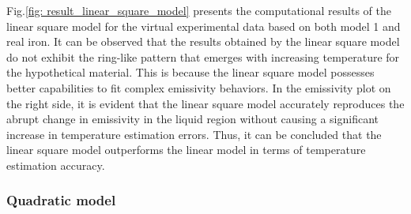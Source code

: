 Fig.\ref{fig: result_linear_square_model} presents the computational results of the 
linear square model for the virtual experimental data based on both model 1 and 
real iron. It can be observed that the results obtained by the linear square 
model do not exhibit the ring-like pattern that emerges with increasing temperature 
for the hypothetical material. This is because the linear square model possesses 
better capabilities to fit complex emissivity behaviors. In the emissivity plot 
on the right side, it is evident that the linear square model accurately 
reproduces the abrupt change in emissivity in the liquid region without 
causing a significant increase in temperature estimation errors. Thus, it can be 
concluded that the linear square model outperforms the linear model in terms 
of temperature estimation accuracy.


\subsubsection{Quadratic model}

